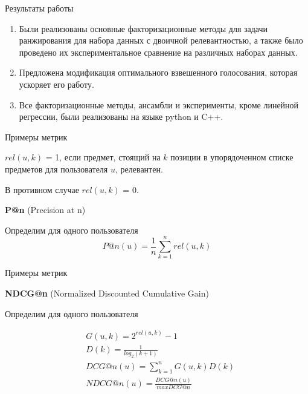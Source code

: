 \documentclass[10pt,pdf,hyperref={unicode}]{beamer}
\begin{document}
\begin{frame}{Результаты работы}

\begin{enumerate}

\item Были реализованы основные факторизационные методы для задачи ранжирования для набора данных с двоичной релевантностью, а также было проведено их экспериментальное сравнение на различных наборах данных.

\item Предложена модификация оптимального взвешенного голосования, которая ускоряет его работу.

\item Все  факторизационные методы, ансамбли  и эксперименты, кроме линейной регрессии, были реализованы на языке python и C++.
\end{enumerate}

\end{frame}

\begin{frame}{Примеры метрик}

$rel(u, k)$ = 1, если предмет, стоящий на $k$ позиции в упорядоченном списке предметов для пользователя $u$, релевантен. 

В противном случае $rel(u, k)$ = 0. 

\bigbreak

\textbf{P@n} (Precision at n)

Определим для одного пользователя
	\begin{equation*}
		P@n(u) = \frac{1}{n}\sum_{k = 1}^n rel(u, k)
	\end{equation*}
	
\end{frame}

\begin{frame}{Примеры метрик}

\textbf{NDCG@n} (Normalized Discounted Cumulative Gain)
	
	Определим для одного пользователя
	
	\begin{equation*}
	\begin{split}
	 & G(u, k) = 2^{rel(u, k)} - 1 \\
	 & D(k) = \frac{1}{log_2(k + 1)} \\
	 & DCG@n(u) = \sum_{k=1}^n G(u, k) D(k) \\
	 & NDCG@n(u) = \frac{DCG@n(u)}{max DCG@n}
	\end{split}			
	\end{equation*}

\end{frame}
\end{document}

